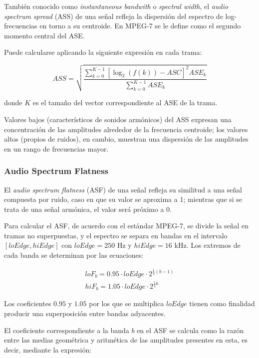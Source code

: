 También conocido como \textit{instantaneous bandwith} o \textit{spectral width}, el \textit{audio spectrum spread} (ASS) de una señal refleja la dispersión del espectro de log-frecuencias en torno a su centroide.
En MPEG-7 se le define como el segundo momento central del ASE\@.

Puede calcularse aplicando la siguiente expresión en cada trama:

\begin{equation}
    \label{eq:ASS}
    ASS = \sqrt{\frac{\sum_{k=0}^{K-1}{\left[ \log_{2}{(f(k))-ASC} \right]^2 ASE_k}}{\sum_{k=0}^{K-1}{ASE_k}}}
\end{equation}

\noindent
donde $K$ es el tamaño del vector correspondiente al ASE de la trama.

Valores bajos (característicos de sonidos armónicos) del ASS expresan una concentración de las amplitudes alrededor de la frecuencia centroide;
los valores altos (propios de ruidos), en cambio, muestran una dispersión de las amplitudes en un rango de frecuencias mayor.

\subsubsection{Audio Spectrum Flatness}

El \textit{audio spectrum flatness} (ASF) de una señal refleja su similitud a una señal compuesta por ruido, caso en que su valor se aproxima a 1;
mientras que si se trata de una señal armónica, el valor será próximo a 0.

Para calcular el ASF, de acuerdo con el estándar MPEG-7, se divide la señal en tramas no superpuestas, y el espectro se separa en bandas en el intervalo $[loEdge, hiEdge]$ con $loEdge = 250$ Hz y $hiEdge = 16$ kHz.
Los extremos de cada banda se determinan por las ecuaciones:

\begin{gather*}
    loF_b = 0.95 \cdot loEdge \cdot 2^{\frac{1}{4}(b-1)}\\
    hiF_b = 1.05 \cdot loEdge \cdot 2^{\frac{1}{4}b}
\end{gather*}

Los coeficientes $0.95$ y $1.05$ por los que se multiplica $loEdge$ tienen como finalidad producir una superposición entre bandas adyacentes.

El coeficiente correspondiente a la banda $b$ en el ASF se calcula como la razón entre las medias geométrica y aritmética de las amplitudes presentes en esta, es decir, mediante la expresión:

